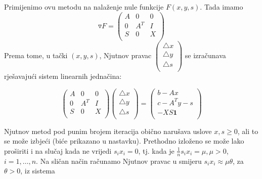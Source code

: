 \documentclass[a4paper, utf8, 11pt, colorlinks]{book}
\begin{document}
Primijenimo ovu metodu na nalaženje nule funkcije $F(x,y,s)$. Tada imamo
$$ \triangledown F =\left ( \begin{array}{ccc}
	A   & 0      &  0      \\
	0   & A^T    &  I      \\
	S   & 0      & X       \\
\end{array} \right ) 
$$
Prema tome, u tački $(x,y,s)$, Njutnov pravac
$
\begin{pmatrix}
	\bigtriangleup  x  \\
	\bigtriangleup  y  \\
	\bigtriangleup  s  \\
\end{pmatrix}
$
se izračunava rješavajući sistem linearnih jednačina:

\begin{equation}
	\begin{pmatrix}
		A   & 0      &  0      \\
		0   & A^T    &  I      \\
		S   & 0      & X       \\
	\end{pmatrix}  
	\begin{pmatrix} 
		\bigtriangleup  x  \\
		\bigtriangleup  y  \\
		\bigtriangleup  s  \\
	\end{pmatrix} 
	= 
	\begin{pmatrix} 
		b - Ax             \\
		c - A^T y - s      \\
		- X S \textbf{1}  \\                   
	\end{pmatrix} 
\end{equation}

Njutnov metod pod punim brojem iteracija obično narušava uslove $x,s \geq 0$, ali to se može izbjeći (biće prikazano u nastavku).  
Prethodno izloženo se može lako proširiti i na slučaj kada ne vrijedi $s_ix_i = 0$, tj. kada je $\frac{1}{n}s_ix_i = \mu, \mu > 0$, $i=1,\ldots,n$. Na sličan način računamo Njutnov pravac u smijeru $s_i x_i \approx \mu \theta$, za  $\theta >0$, iz sistema 
\end{document}
